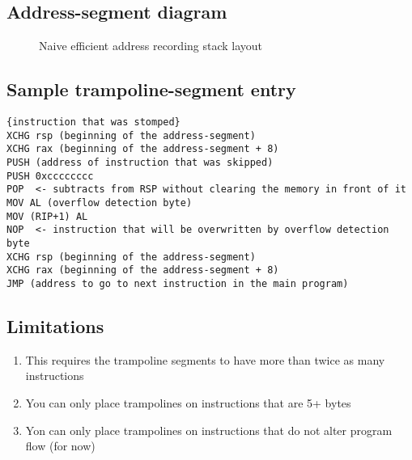 \subsection{Address-segment diagram}
\break
\begin{figure}
\begin{drawstack}
  \startframe
   
   \cellcom{}
     
  \startframe
   \cellcom{}
     
   
   \cellcom{}
   \cellcom{}
   \cellcom{}
   
\end{drawstack}

  \caption{Naive efficient address recording stack layout}
\end{figure}


\subsection{Sample trampoline-segment entry}

\begin{verbatim}
{instruction that was stomped}
XCHG rsp (beginning of the address-segment)
XCHG rax (beginning of the address-segment + 8)
PUSH (address of instruction that was skipped)
PUSH 0xcccccccc
POP  <- subtracts from RSP without clearing the memory in front of it 
MOV AL (overflow detection byte) 
MOV (RIP+1) AL
NOP  <- instruction that will be overwritten by overflow detection byte
XCHG rsp (beginning of the address-segment)
XCHG rax (beginning of the address-segment + 8)
JMP (address to go to next instruction in the main program)
\end{verbatim}


\subsection{Limitations}
\begin{enumerate}
    \item This requires the trampoline segments to have more than twice as many instructions
    \item You can only place trampolines on instructions that are 5+ bytes 
    \item Yon can only place trampolines on instructions that do not alter program flow (for now)
\end{enumerate}
